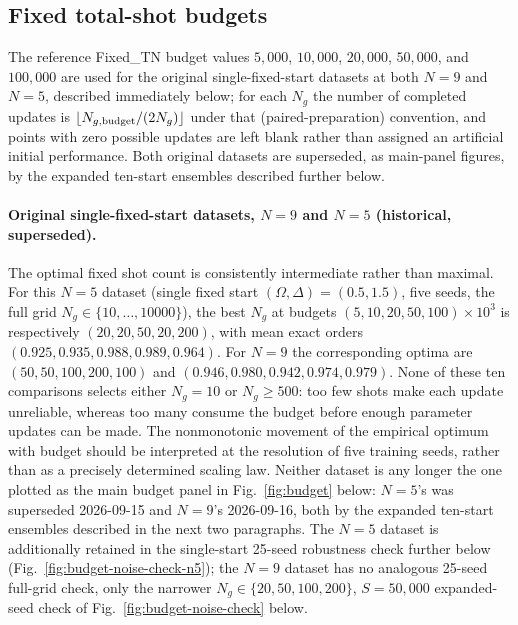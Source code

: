 \documentclass[11pt]{article}
\begin{document}
\FloatBarrier
\subsection{Fixed total-shot budgets}
\label{sec:budget}

The reference Fixed\_TN budget values $5{,}000$, $10{,}000$, $20{,}000$, $50{,}000$,
and $100{,}000$ are used for the original single-fixed-start datasets at both
$N=9$ and $N=5$, described immediately below; for each $N_g$ the number of
completed updates is $\lfloor N_{g,{\rm budget}}/(2N_g)\rfloor$ under that
(paired-preparation) convention, and points with zero possible updates are left
blank rather than assigned an artificial initial performance.  Both original
datasets are superseded, as main-panel figures, by the expanded ten-start
ensembles described further below.

\paragraph{Original single-fixed-start datasets, $N=9$ and $N=5$ (historical,
superseded).}
The optimal fixed shot count is consistently intermediate rather than maximal.  For
this $N=5$ dataset (single fixed start $(\Omega,\Delta)=(0.5,1.5)$, five seeds, the
full grid $N_g\in\{10,\dots,10000\}$), the best $N_g$ at budgets
$(5,10,20,50,100)\times10^3$ is respectively $(20,20,50,20,200)$, with mean exact
orders $(0.925,0.935,0.988,0.989,0.964)$.  For $N=9$ the corresponding optima are
$(50,50,100,200,100)$ and $(0.946,0.980,0.942,0.974,0.979)$.  None of these ten
comparisons selects either $N_g=10$ or $N_g\ge500$: too few shots make each update
unreliable, whereas too many consume the budget before enough parameter updates can
be made.  The nonmonotonic movement of the empirical optimum with budget should be
interpreted at the resolution of five training seeds, rather than as a precisely
determined scaling law.  Neither dataset is any longer the one plotted as the main
budget panel in Fig.~\ref{fig:budget} below: $N=5$'s was superseded 2026-09-15 and
$N=9$'s 2026-09-16, both by the expanded ten-start ensembles described in the next
two paragraphs.  The $N=5$ dataset is additionally retained in the single-start
25-seed robustness check further below (Fig.~\ref{fig:budget-noise-check-n5}); the
$N=9$ dataset has no analogous 25-seed full-grid check, only the narrower
$N_g\in\{20,50,100,200\}$, $S=50{,}000$ expanded-seed check of
Fig.~\ref{fig:budget-noise-check} below.
\end{document}
